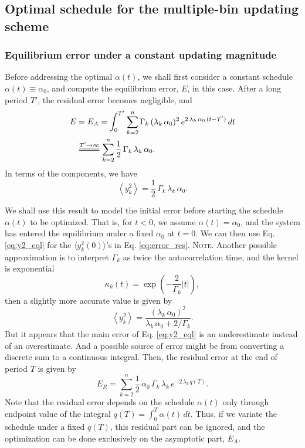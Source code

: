 \documentclass[reprint, floatfix]{revtex4-1}
\newcommand{\note}[1]{{\color{DarkGreen}\footnotesize \textsc{Note.} #1}}
\newcommand{\Err}{E}
\begin{document}
\subsection{\label{sec:mbin_opta}
Optimal schedule for the multiple-bin updating scheme}



\subsubsection{\label{eq:eqlerr}
Equilibrium error under a constant updating magnitude
}


Before addressing the optimal $\alpha(t)$,
we shall first consider a constant schedule
$\alpha(t) \equiv \alpha_0$,
and compute the equilibrium error, $\Err$,
in this case.
%
After a long period $T'$,
the residual error becomes negligible, and
%
\begin{align}
  \Err
  &=
  \Err_A
  =
  \int_0^{T'}
    \sum_{k = 2}^n
      \Gamma_k \, (\lambda_k \, \alpha_0)^2 \,
      e^{ 2 \, \lambda_k \, \alpha_0 \, (t - T') }
    \, dt
  \notag
  \\
  &
  \stackrel{ T' \to \infty }
  { =\joinrel=\joinrel=\joinrel= }
  \sum_{ k = 2 }^n
    \frac 1 2 \, \Gamma_k \, \lambda_k \, \alpha_0.
  \label{eq:error_eql}
\end{align}
%
In terms of the components, we have
%
\begin{equation}
  \left\langle
    y_k^2
  \right\rangle
  =
  \frac 1 2 \, \Gamma_k \, \lambda_k \, \alpha_0.
  \label{eq:y2_eql}
\end{equation}
%


We shall use this result to model the initial error
before starting the schedule $\alpha(t)$ to be optimized.
%
That is, for $t < 0$, we assume
$\alpha(t) = \alpha_0$, and
the system has entered the equilibrium
under a fixed $\alpha_0$ at $t = 0$.
%
We can then use Eq. \eqref{eq:y2_eql}
for the $\langle y_k^2(0) \rangle$'s in Eq. \eqref{eq:error_res}.
%
\note{Another possible approximation
  is to interpret $\Gamma_k$ as twice the autocorrelation time,
  and the kernel is exponential
  $$
  \kappa_k(t) = \exp\left( - \frac{2}{\Gamma_k} |t| \right),
  $$
  then a slightly more accurate value is given by\cite{vankampen}
  $$
  \left\langle
    y_k^2
  \right\rangle
  =
  \frac{      ( \lambda_k \, \alpha_0 )^2     }
       { \lambda_k \, \alpha_0 + 2 / \Gamma_k }.
  $$
  But it appears that the main error of Eq. \eqref{eq:y2_eql}
  is an underestimate instead of an overestimate.
  And a possible source of error might be from
  converting a discrete sum to a continuous integral.
}
%
Then,
the residual error at the end of period $T$
is given by
%
\begin{equation}
  \Err_R
  =
  \sum_{k = 2}^n
      \frac 1 2 \, \alpha_0 \, \Gamma_k \, \lambda_k \,
      e^{  - 2 \, \lambda_k \, q(T) }
  .
  \label{eq:error_res1}
\end{equation}
%
Note that the residual error
depends on the schedule $\alpha(t)$
only through endpoint value of
the integral $q(T) = \int_0^T \alpha(t) \, dt$.
%
Thus, if we variate the schedule under a fixed $q(T)$,
this residual part can be ignored,
and the optimization can be done exclusively
on the asymptotic part, $\Err_A$.
\end{document}

